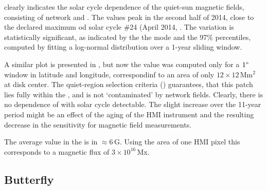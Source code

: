 \documentclass{aa}
\begin{document}
 clearly indicates the solar cycle dependence of the quiet-sun magnetic fields, consisting of network and \IN{}. The \brms{} values peak in the second half of 2014, close to the declared maximum od solar cycle \#24 (April 2014, . The variation is statistically significant, as indicated by the the mode and the 97\% percentiles, computed by fitting a log-normal distribution over a 1-year sliding window.

A similar plot is presented in , but now the \brms{} value was computed only for a $1\degree$ window in latitude and longitude, correspondinf to an area of only $12\times 12$\,Mm$^2$ at disk center. The quiet-region selection criteria () guarantees, that this patch lies fully within the \IN{}, and is not `contaminated' by network fields. Clearly, there is no dependence of \brms{} with solar cycle detectable. The slight increase over the 11-year period might be an effect of the aging of the HMI instrument and the resulting decrease in the sensitivity for magnetic field measurements.

The average \brms{} value in the \IN{} is in $\approx6$\,G. Using the area of one HMI pixel this corresponds to a magnetic flux of $3\times 10^16$\,Mx. 




\subsection{Butterfly}
\end{document}
